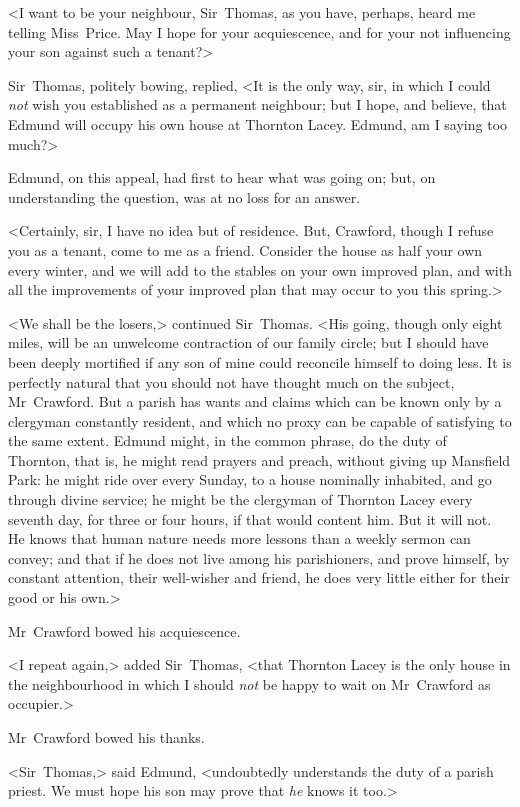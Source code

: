 <I want to be your neighbour, Sir~Thomas, as you have, perhaps, heard me telling Miss~Price. May I hope for your acquiescence, and for your not influencing your son against such a tenant?>

Sir~Thomas, politely bowing, replied, <It is the only way, sir, in which I could \textit{not}  wish you established as a permanent neighbour; but I hope, and believe, that Edmund will occupy his own house at Thornton Lacey. Edmund, am I saying too much?>

Edmund, on this appeal, had first to hear what was going on; but, on understanding the question, was at no loss for an answer.

<Certainly, sir, I have no idea but of residence. But, Crawford, though I refuse you as a tenant, come to me as a friend. Consider the house as half your own every winter, and we will add to the stables on your own improved plan, and with all the improvements of your improved plan that may occur to you this spring.>

<We shall be the losers,> continued Sir~Thomas. <His going, though only eight miles, will be an unwelcome contraction of our family circle; but I should have been deeply mortified if any son of mine could reconcile himself to doing less. It is perfectly natural that you should not have thought much on the subject, Mr~Crawford. But a parish has wants and claims which can be known only by a clergyman constantly resident, and which no proxy can be capable of satisfying to the same extent. Edmund might, in the common phrase, do the duty of Thornton, that is, he might read prayers and preach, without giving up Mansfield Park: he might ride over every Sunday, to a house nominally inhabited, and go through divine service; he might be the clergyman of Thornton Lacey every seventh day, for three or four hours, if that would content him. But it will not. He knows that human nature needs more lessons than a weekly sermon can convey; and that if he does not live among his parishioners, and prove himself, by constant attention, their well-wisher and friend, he does very little either for their good or his own.>

Mr~Crawford bowed his acquiescence.

<I repeat again,> added Sir~Thomas, <that Thornton Lacey is the only house in the neighbourhood in which I should \textit{not}  be happy to wait on Mr~Crawford as occupier.>

Mr~Crawford bowed his thanks.

<Sir~Thomas,> said Edmund, <undoubtedly understands the duty of a parish priest. We must hope his son may prove that \textit{he}  knows it too.>

